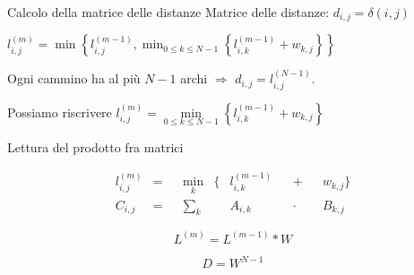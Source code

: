 \documentclass{beamer}
\theoremstyle{plain}
\theoremstyle{definition}
\theoremstyle{remark}
\newcommand{\set}[1]{\left\{#1\right\}}
\begin{document}
\begin{frame}{Calcolo della matrice delle distanze}
  Matrice delle distanze: $d_{i,j} = \delta(i,j)$
  \pause
  \vfill
  
  $l^{(m)}_{i,j} = \min\set{ l^{(m-1)} _{i,j} , \min _{0\le k\le N-1}
    \set{ l^{(m-1)} _{i,k} + w_{k,j}} }$
  \pause
  
  Ogni cammino ha al pi\`u $N-1$ archi $\Rightarrow$ $d_{i,j} = l^{(N-1)}
  _{i,j}$.
  \pause
  \vfill
  
  Possiamo riscrivere $l^{(m)}_{i,j} = \min \limits _{0\le k\le N-1}
  \set{ l^{(m-1)} _{i,k} + w_{k,j}}$
\end{frame}

\begin{frame}{Lettura del prodotto fra matrici}
  \begin{block}{}
    \begin{align*}
      l^{(m)}_{i,j} &=& & \min \limits _k & \Big\{ & l^{(m-1)}
      _{i,k} & & +  & & w_{k,j} \Big\} \\
      C_{i,j} &=& &\sum _k  & &  A_{i,k}  & & \cdot  & &B_{k,j} 
    \end{align*}
  \end{block}
  \pause
  
  \[ L^{(m)} = L^{(m-1)} * W \]

  \begin{block}{}
    \[ D = W^{N-1} \]
  \end{block}
\end{frame}
\end{document}
